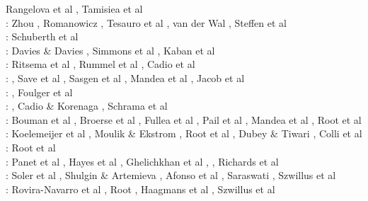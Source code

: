 \begin{scriptsize}
Rangelova et al \cite{ravb07}, Tamisiea et al \cite{tamd07}\\
\twothousandeight: Zhou \cite{zhou08}, Romanowicz \cite{roma08}, Tesauro et al \cite{tekc08}, van der Wal \cite{vaws08}, 
Steffen et al \cite{stdm08}\\
\twothousandnine: Schuberth et al \cite{scbr09}\\
\twothousandten: Davies \& Davies \cite{dada10}, Simmons et al \cite{sifb10}, Kaban et al \cite{katc10}\\
\twothousandeleven: Ritsema et al \cite{ridv11}, Rummel et al \cite{ruys11}, Cadio et al \cite{capd11}\\
\twothousandtwelve: \cite{hawj12}\cite{resa12}\cite{hawj12}\cite{fesw12}\cite{simj12}\cite{beck12}\cite{pahk12}, Save et al \cite{sabt12}, Sasgen et al \cite{sakm12}, Mandea et al \cite{mapl12}, Jacob et al \cite{jawp12}\\
\twothousandthirteen: \cite{ress13}\cite{ebbf13}\cite{davi13}\cite{scle13}\cite{waja13}, Foulger et al \cite{fopa13}\\
\twothousandfourteen: \cite{paml14}\cite{ebbf14}\cite{krbk14}\cite{licl14}\cite{aubb14}, 
Cadio \& Korenaga \cite{cako14}, Schrama et al \cite{scwr14}\\
\twothousandfifteen: Bouman et al \cite{boem15}, Broerse et al \cite{brrs15}, Fullea et al \cite{furc15}, Pail et al \cite{pabb15},
Mandea et al \cite{manp15}, Root et al \cite{rotv15}\\
\twothousandsixteen: Koelemeijer et al \cite{kord16}, Moulik \& Ekstrom \cite{moek16}, Root et al \cite{rond16}, 
Dubey \& Tiwari \cite{duti16}, Colli et al \cite{cogb16}\\
\twothousandseventeen: Root et al \cite{roev17}\\
\twothousandeighteen: Panet et al \cite{pabn18}, Hayes et al \cite{hamp18}, Ghelichkhan et al \cite{ghmc18}, \cite{homs18}, Richards et al \cite{rihc18}\\
\twothousandnineteen: Soler et al \cite{sopg19}, Shulgin \& Artemieva \cite{shar19}, Afonso et al \cite{afss19}, 
Saraswati \cite{sacm19}, Szwillus et al \cite{szae19}\\
\twothousandtwenty: Rovira-Navarro et al \cite{rovb20}, Root \cite{root20}, Haagmans et al \cite{hasm20}, Szwillus et al \cite{szes20}
\end{scriptsize}

